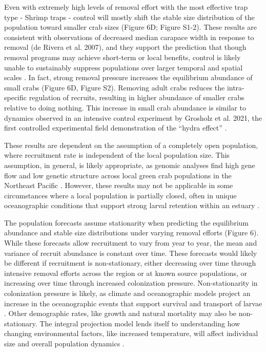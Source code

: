 \documentclass{article}
\begin{document}
Even with extremely high levels of removal effort with the most effective trap type - Shrimp traps - control will mostly shift the stable size distribution of the population toward smaller crab sizes (Figure 6D; Figure S1-2). These results are consistent with observations of decreased median carapace width in response to removal (de Rivera et al. 2007), and they support the prediction that though removal programs may achieve short-term or local benefits, control is likely unable to sustainably suppress populations over larger temporal and spatial scales \parencite{keller2025transition, tummon2024rebound, kanary2014modelling}. In fact, strong removal pressure increases the equilibrium abundance of small crabs (Figure 6D, Figure S2). Removing adult crabs reduces the intra-specific regulation of recruits, resulting in higher abundance of smaller crabs relative to doing nothing. This increase in small crab abundance is similar to dynamics observed in an intensive control experiment by Grosholz et al. 2021, the first controlled experimental field demonstration of the “hydra effect” \parencite{grosholz2021stage}.

These results are dependent on the assumption of a completely open population, where recruitment rate is independent of the local population size. This assumption, in general, is likely appropriate, as genomic analyses find high gene flow and low genetic structure across local green crab populations in the Northeast Pacific \parencite{tepolt2009european, tepolt2022balanced}. However, these results may not be applicable in some circumstances where a local population is partially closed, often in unique oceanographic conditions that support strong larval retention within an estuary \parencite{grosholz2021stage}. 

The population forecasts assume stationarity when predicting the equilibrium abundance and stable size distributions under varying removal efforts (Figure 6). While these forecasts allow recruitment to vary from year to year, the mean and variance of recruit abundance is constant over time. These forecasts would likely be different if recruitment is non-stationary, either decreasing over time through intensive removal efforts across the region or at known source populations, or increasing over time through increased colonization pressure. Non-stationarity in colonization pressure is likely, as climate and oceanographic models project an increase in the oceanographic events that support survival and transport of larvae \parencite{du2024dispersal, cai2021changing}. Other demographic rates, like growth and natural mortality may also be non-stationary. The integral projection model lends itself to understanding how changing environmental factors, like increased temperature, will affect individual size and overall population dynamics \parencite{plard2019ipm, dahlgren2011incorporating}. 
\end{document}
